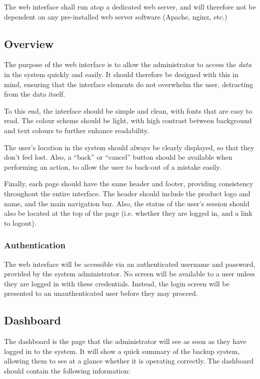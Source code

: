 The web interface shall run atop a dedicated web server, and will therefore not
be dependent on any pre-installed web server software (Apache, nginx, etc.)

\subsection{Overview}

The purpose of the web interface is to allow the administrator to access the
\emph{data} in the system quickly and easily. It should therefore be designed
with this in mind, ensuring that the interface elements do not overwhelm the
user, detracting from the data itself.

To this end, the interface should be simple and clean, with fonts that are easy
to read. The colour scheme should be light, with high contrast between
background and text colours to further enhance readability.

The user's location in the system should always be clearly displayed, so that
they don't feel lost. Also, a ``back'' or ``cancel'' button should be available
when performing an action, to allow the user to back-out of a mistake easily.

Finally, each page should have the same header and footer, providing
consistency throughout the entire interface. The header should include the
product logo and name, and the main navigation bar. Also, the status of the
user's session should also be located at the top of the page (i.e. whether they
are logged in, and a link to logout).

\subsubsection{Authentication}

The web interface will be accessible via an authenticated username and
password, provided by the system administrator. No screen will be available to
a user unless they are logged in with these credentials. Instead, the login
screen will be presented to an unauthenticated user before they may proceed.

\subsection{Dashboard}

The dashboard is the page that the administrator will see as soon as they have
logged in to the system. It will show a quick summary of the backup system,
allowing them to see at a glance whether it is operating correctly. The
dashboard should contain the following information:

